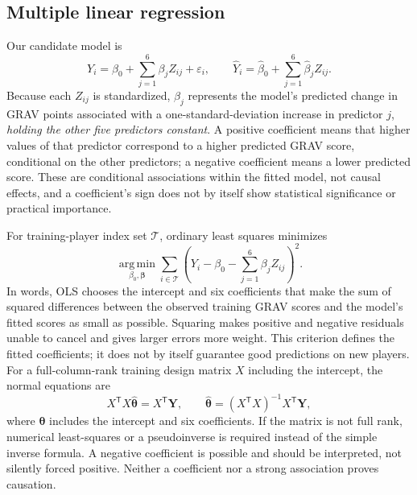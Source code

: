 \documentclass[11pt]{article}
\begin{document}
\subsection{Multiple linear regression}
Our candidate model is
\begin{equation}
Y_i=\beta_0+\sum_{j=1}^{6}\beta_j Z_{ij}+\varepsilon_i,
\qquad
\widehat Y_i=\widehat\beta_0+\sum_{j=1}^{6}\widehat\beta_j Z_{ij}.
\label{eq:ols}
\end{equation}
Because each $Z_{ij}$ is standardized, $\beta_j$ represents the model's
predicted change in GRAV points associated with a one-standard-deviation
increase in predictor $j$, \emph{holding the other five predictors
constant}. A positive coefficient means that higher values of that
predictor correspond to a higher predicted GRAV score, conditional on the
other predictors; a negative coefficient means a lower predicted score.
These are conditional associations within the fitted model, not causal
effects, and a coefficient's sign does not by itself show statistical
significance or practical importance.

For training-player index set $\mathcal T$, ordinary least squares minimizes
\begin{equation}
\underset{\beta_0,\boldsymbol\beta}{\operatorname{arg\,min}}
\sum_{i\in\mathcal T}
\left(Y_i-\beta_0-\sum_{j=1}^{6}\beta_jZ_{ij}\right)^2.
\label{eq:least-squares}
\end{equation}
In words, OLS chooses the intercept and six coefficients that make the
sum of squared differences between the observed training GRAV scores and
the model's fitted scores as small as possible. Squaring makes positive
and negative residuals unable to cancel and gives larger errors more
weight. This criterion defines the fitted coefficients; it does not by
itself guarantee good predictions on new players.
For a full-column-rank training design matrix $X$ including the intercept,
the normal equations are
\begin{equation}
X^{\mathsf T}X\widehat{\boldsymbol\theta}=X^{\mathsf T}\mathbf Y,
\qquad
\widehat{\boldsymbol\theta}=(X^{\mathsf T}X)^{-1}X^{\mathsf T}\mathbf Y,
\label{eq:normal}
\end{equation}
where $\boldsymbol\theta$ includes the intercept and six coefficients.
If the matrix is not full rank, numerical least-squares or a pseudoinverse is
required instead of the simple inverse formula. A negative coefficient is
possible and should be interpreted, not silently forced positive. Neither a
coefficient nor a strong association proves causation.
\end{document}
